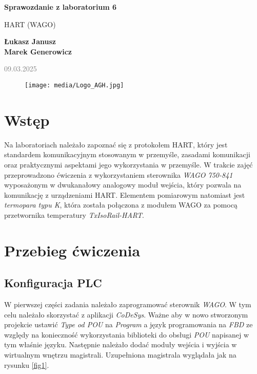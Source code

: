 \documentclass{article}
\begin{document}
\begin{titlepage}
    \begin{center}
        \vspace*{1cm}
            
        \Huge
        \textbf{Sprawozdanie z laboratorium 6}
            
        \vspace{0.5cm}
        \LARGE
        HART (WAGO)
            
        \vspace{1.5cm}
            
        \textbf{Łukasz Janusz\\Marek Generowicz}

        \normalsize      
        \textcolor{gray}{09.03.2025}
        \vfill
        \begin{figure}[hb]
            \centering
            \texttt{[image: media/Logo\_AGH.jpg]}
        \end{figure}
                        
            
    \end{center}
\end{titlepage}

\section{Wstęp}
Na laboratoriach należało zapoznać się z protokołem HART, który jest standardem komunikacyjnym stosowanym w przemyśle, zasadami komunikacji oraz praktycznymi aspektami jego wykorzystania w przemyśle. W trakcie zajęć przeprowadzono ćwiczenia z wykorzystaniem sterownika \textit{WAGO 750-841} wyposażonym w dwukanałowy analogowy moduł wejścia, który pozwala na komunikację z urządzeniami HART. Elementem pomiarowym natomiast jest \textit{termopara typu K}, która została połączona z modułem WAGO za pomocą przetwornika temperatury \textit{TxIsoRail-HART}. 

\section{Przebieg ćwiczenia}

\subsection{Konfiguracja PLC}
W pierwszej części zadania należało zaprogramować sterownik \textit{WAGO}. W tym celu należało skorzystać z aplikacji \textit{CoDeSys}. Ważne aby w nowo stworzonym projekcie ustawić \textit{Type od POU} na \textit{Program} a język programowania na \textit{FBD} ze względy na konieczność wykorzystania biblioteki do obsługi \textit{POU} napisanej w tym właśnie języku. Następnie należało dodać moduły wejścia i wyjścia w wirtualnym wnętrzu magistrali. Uzupełniona magistrala wyglądała jak na rysunku \ref{fig1}.
\end{document}
